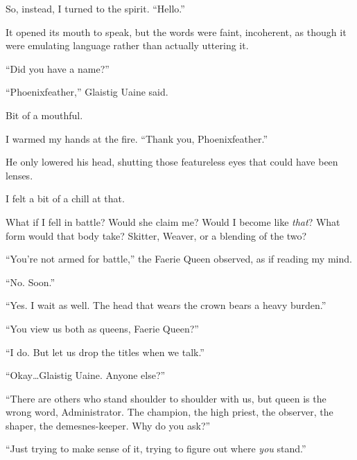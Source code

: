 So, instead, I turned to the spirit.  ``Hello.''



It opened its mouth to speak, but the words were faint, incoherent, as though it were emulating language rather than actually uttering it.



``Did you have a name?''



``Phoenixfeather,'' Glaistig Uaine said.



Bit of a mouthful.



I warmed my hands at the fire.  ``Thank you, Phoenixfeather.''



He only lowered his head, shutting those featureless eyes that could have been lenses.



I felt a bit of a chill at that.



What if I fell in battle?  Would she claim me?  Would I become like \emph{that}?  What form would that body take?  Skitter, Weaver, or a blending of the two?



``You're not armed for battle,'' the Faerie Queen observed, as if reading my mind.



``No.  Soon.''



``Yes.  I wait as well.  The head that wears the crown bears a heavy burden.''



``You view us both as queens, Faerie Queen?''



``I do.  But let us drop the titles when we talk.''



``Okay\ldots Glaistig Uaine.  Anyone else?''



``There are others who stand shoulder to shoulder with us, but queen is the wrong word, Administrator.  The champion, the high priest, the observer, the shaper, the demesnes-keeper.  Why do you ask?''



``Just trying to make sense of it, trying to figure out where \emph{you} stand.''



